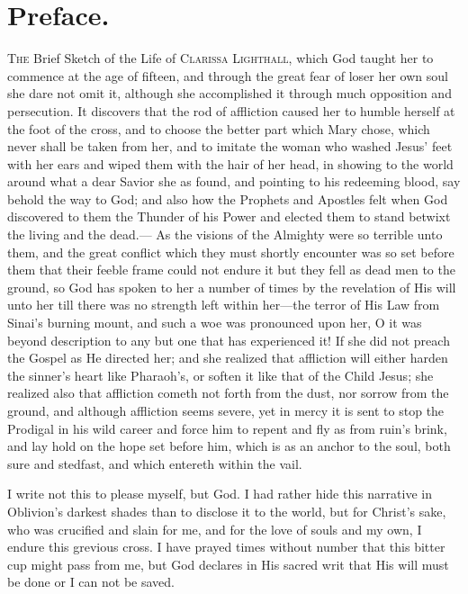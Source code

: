 \documentclass{article}
\begin{document}
\section*{Preface.}
\textsc{The} Brief Sketch of the Life of \textsc{Clarissa Lighthall}, which God taught her to commence at the age of fifteen, and through the great fear of loser her own soul she dare not omit it, although she accomplished it through much opposition and persecution.
It discovers that the rod of affliction caused her to humble herself at the foot of the cross, and to choose the better part which Mary chose, which never shall be taken from her, and to imitate the woman who washed Jesus' feet with her ears and wiped them with the hair of her head, in showing to the world around what a dear Savior she as found, and pointing to his redeeming blood, say behold the way to God; and also how the Prophets and Apostles felt when God discovered to them the Thunder of his Power and elected them to stand betwixt the living and the dead.---
As the visions of the Almighty were so terrible unto them, and the great conflict which they must shortly encounter was so set before them that their feeble frame could not endure it but they fell as dead men to the ground, so God has spoken to her a number of times by the revelation of His will unto her till there was no strength left within her---the terror of His Law from Sinai's burning mount, and such a woe was pronounced upon her, O it was beyond description to any but one that has experienced it!
If she did not preach the Gospel as He directed her; and she realized that affliction will either harden the sinner's heart like Pharaoh's, or soften it like that of the Child Jesus; she realized also that affliction cometh not forth from the dust, nor sorrow from the ground, and although affliction seems severe, yet in mercy it is sent to stop the Prodigal in his wild career and force him to repent and fly as from ruin's brink, and lay hold on the hope set before him, which is as an anchor to the soul, both sure and stedfast, and which entereth within the vail.

I write not this to please myself, but God.
I had rather hide this narrative in Oblivion's darkest shades than to disclose it to the world, but for Christ's sake, who was crucified and slain for me, and for the love of souls and my own, I endure this grevious cross.
I have prayed times without number that this bitter cup might pass from me, but God declares in His sacred writ that His will must be done or I can not be saved.
\end{document}
